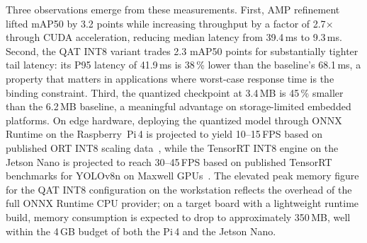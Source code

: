 \documentclass[conference]{IEEEtran}
\begin{document}
\begin{table}[htbp]
\caption{Pipeline Performance Summary (Development Workstation)}
\label{tab:full_results}
\begin{center}
\end{center}
\end{table}

Three observations emerge from these measurements. First, AMP refinement lifted mAP50 by 3.2 points while increasing throughput by a factor of 2.7$\times$ through CUDA acceleration, reducing median latency from 39.4\,ms to 9.3\,ms. Second, the QAT INT8 variant trades 2.3 mAP50 points for substantially tighter tail latency: its P95 latency of 41.9\,ms is 38\,\% lower than the baseline's 68.1\,ms, a property that matters in applications where worst-case response time is the binding constraint. Third, the quantized checkpoint at 3.4\,MB is 45\,\% smaller than the 6.2\,MB baseline, a meaningful advantage on storage-limited embedded platforms. On edge hardware, deploying the quantized model through ONNX Runtime on the Raspberry~Pi\,4 is projected to yield 10--15\,FPS based on published ORT INT8 scaling data~\cite{b13}, while the TensorRT INT8 engine on the Jetson Nano is projected to reach 30--45\,FPS based on published TensorRT benchmarks for YOLOv8n on Maxwell GPUs~\cite{b14}. The elevated peak memory figure for the QAT INT8 configuration on the workstation reflects the overhead of the full ONNX Runtime CPU provider; on a target board with a lightweight runtime build, memory consumption is expected to drop to approximately 350\,MB, well within the 4\,GB budget of both the Pi\,4 and the Jetson Nano.

\end{document}
